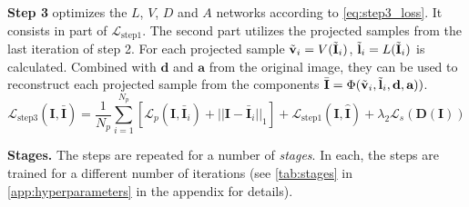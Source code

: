 \textbf{Step 3} optimizes the $L$, $V$, $D$ and $A$ networks according to \autoref{eq:step3_loss}. It consists in part of $\mathcal{L}_{\text{step1}}$. The second part utilizes the projected samples from the last iteration of step 2. For each projected sample $\Tilde{\textbf{v}}_i=V(\Tilde{\textbf{I}}_i)$, $\Tilde{\textbf{l}}_i=L(\Tilde{\textbf{I}}_i)$ is calculated. Combined with $\textbf{d}$ and  $\textbf{a}$ from the original image, they can be used to reconstruct each projected sample from the components  $\bar{\textbf{I}} = \Phi(\Tilde{\textbf{v}}_i, \Tilde{\textbf{l}}_i, \textbf{d}, \textbf{a}))$.
\begin{equation}
    \mathcal{L}_{\text{step3}}(\textbf{I}, \bar{\textbf{I}})
    = \frac{1}{N_p} \sum_{i=1}^{N_p} [\mathcal{L}_p (\textbf{I}, \bar{\textbf{I}}_i ) + ||\textbf{I} - \bar{\textbf{I}}_i ||_1] + \mathcal{L}_\text{step1}(\textbf{I}, \hat{\textbf{I}}) + \lambda_2 \mathcal{L}_{s}(\textbf{D}(\textbf{I}))
    \label{eq:step3_loss}
\end{equation}

\textbf{Stages.} The steps are repeated for a number of \textit{stages}. In each, the steps are trained for a different number of iterations (see \autoref{tab:stages} in \autoref{app:hyperparameters} in the appendix for details).

